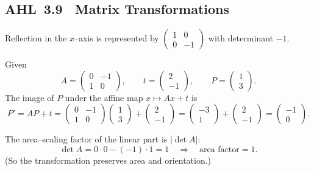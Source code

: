 \documentclass[11pt]{article}
\def\mathbf#1{#1}%
\newcommand{\tocsubsection}[1]{\subsection{#1}}
\begin{document}
\tocsubsection{AHL 3.9 \; Matrix Transformations}


\begin{solution}
Reflection in the $x$–axis is represented by $\begin{pmatrix}1&0\\0&-1\end{pmatrix}$ with determinant $-1$.
\end{solution}

\begin{solution}
Given
\[
A=\begin{pmatrix}0&-1\\[2pt]1&0\end{pmatrix},\qquad 
\mathbf t=\begin{pmatrix}2\\[2pt]-1\end{pmatrix},\qquad 
P=\begin{pmatrix}1\\[2pt]3\end{pmatrix}.
\]
The image of \(P\) under the affine map \(\mathbf x \mapsto A\mathbf x+\mathbf t\) is
\[
P' = A P + \mathbf t
   = \begin{pmatrix}0&-1\\ 1&0\end{pmatrix}\!\begin{pmatrix}1\\3\end{pmatrix}
     + \begin{pmatrix}2\\-1\end{pmatrix}
   = \begin{pmatrix}-3\\ 1\end{pmatrix}
     + \begin{pmatrix}2\\-1\end{pmatrix}
   = \boxed{\begin{pmatrix}-1\\ 0\end{pmatrix}}.
\]

The area–scaling factor of the linear part is \(|\det A|\):
\[
\det A = 0\cdot 0 - (-1)\cdot 1 = 1 \quad\Rightarrow\quad
\text{area factor}=\boxed{1}.
\]
(So the transformation preserves area and orientation.)
\end{solution}
\end{document}
